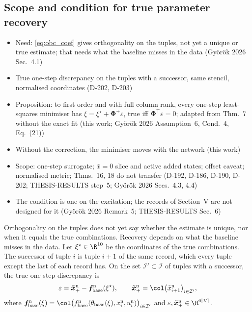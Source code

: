\subsection{Scope and condition for true parameter recovery}\label{sec:obc_scope}
\ifdraft
\begin{itemize}
\item Need: \eqref{eq:obc_coef} gives orthogonality on the tuples, not yet a unique or true estimate; that needs what the baseline misses in the data (Gy\"or\"ok 2026 Sec.~4.1)
\item True one-step discrepancy on the tuples with a successor, same stencil, normalised coordinates (D-202, D-203)
\item Proposition: to first order and with full column rank, every one-step least-squares minimiser has $\xi=\xi^\star+\boldsymbol\Phi^{+}\varepsilon$, true iff $\boldsymbol\Phi^\top\varepsilon=0$; adapted from Thm.~7 without the exact fit (this work; Gy\"or\"ok 2026 Assumption~6, Cond.~4, Eq.~(21))
\item Without the correction, the minimiser moves with the network (this work)
\item Scope: one-step surrogate; $\bar x=0$ slice and active added states; offset caveat; normalised metric; Thms.~16, 18 do not transfer (D-192, D-186, D-190, D-202; THESIS-RESULTS step~5; Gy\"or\"ok 2026 Secs.~4.3, 4.4)
\item The condition is one on the excitation; the records of Section~V are not designed for it (Gy\"or\"ok 2026 Remark~5; THESIS-RESULTS Sec.~6)
\end{itemize}
\fi

Orthogonality on the tuples does not yet say whether the estimate is unique,
nor when it equals the true combinations.
Recovery depends on what the baseline misses in the data.
Let $\xi^\star\in\R^{10}$ be the coordinates of the true combinations.
The successor of tuple $i$ is tuple $i+1$ of the same record, which every
tuple except the last of each record has.
On the set $\mathcal I'\subset\mathcal I$ of tuples with a successor, the true
one-step discrepancy is
\begin{equation}
 \varepsilon
 =\boldsymbol{\tilde x}^{\mathrm n}_{+}-\boldsymbol f^{\mathrm n}_{\mathrm{base}}(\xi^\star),
 \qquad
 \boldsymbol{\tilde x}^{\mathrm n}_{+}=\col\bigl(\tilde x^{\mathrm n}_{i+1}\bigr)_{i\in\mathcal I'},
\label{eq:obc_eps}
\end{equation}
where
$\boldsymbol f^{\mathrm n}_{\mathrm{base}}(\xi)=\col\bigl(f^{\mathrm n}_{\mathrm{base}}(\theta_{\mathrm{base}}(\xi),\tilde x^{\mathrm n}_i,u^{\mathrm n}_i)\bigr)_{i\in\mathcal I'}$
and $\varepsilon,\boldsymbol{\tilde x}^{\mathrm n}_{+}\in\R^{6|\mathcal I'|}$.

